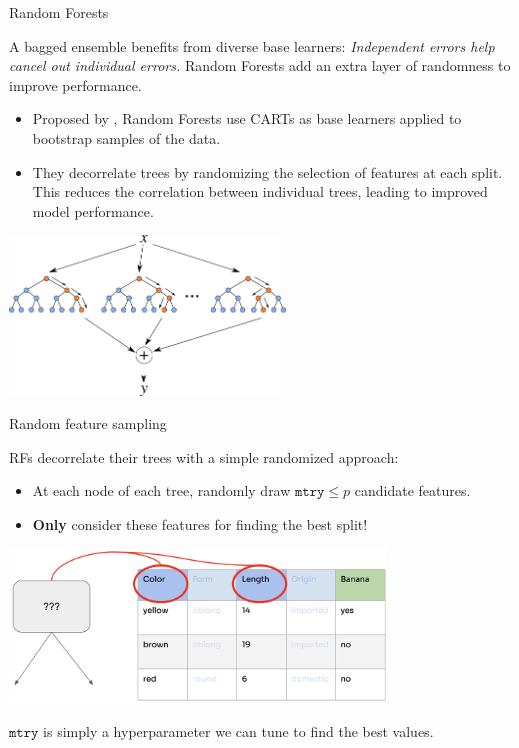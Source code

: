 \documentclass[11pt,compress,t,notes=noshow, xcolor=table]{beamer}
\begin{document}
\begin{vbframe}{Random Forests}

A bagged ensemble benefits from diverse base learners: \textit{Independent errors help cancel out individual errors.} Random Forests add an extra layer of randomness to improve performance.

\begin{itemize}
\item Proposed by , Random Forests use CARTs as base learners applied to bootstrap samples of the data.
\item They decorrelate trees by randomizing the selection of features at each split. This reduces the correlation between individual trees, leading to improved model performance.
\end{itemize}

\begin{center}
\includegraphics[width=0.55\textwidth]{figure_man/forest.png}
\end{center}

\end{vbframe}


\begin{vbframe}{Random feature sampling}

RFs decorrelate their trees with a simple randomized approach:

\begin{itemize}
  \item At each node of each tree, randomly draw $\texttt{mtry} \le p$ candidate features.
  \item \textbf{Only} consider these features for finding the best split!
\end{itemize}

\begin{center}
\includegraphics[width=0.75\textwidth]{figure_man/forest-feature-sampling.png}
\end{center}

$\texttt{mtry}$ is simply a hyperparameter we can tune to find the best values.

\end{vbframe}
\end{document}
